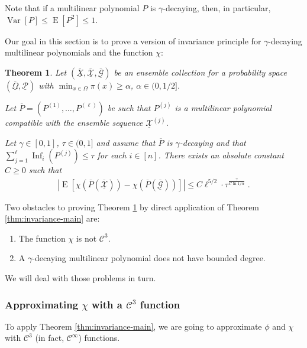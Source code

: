 \documentclass{daj}
\newcommand{\1}{\mathbbm{1}}
\theoremstyle{plain}
\newtheorem{theorem}{Theorem}[section]
\theoremstyle{definition}
\DeclareMathOperator*{\EE}{E}
\DeclareMathOperator*{\Var}{Var}
\DeclareMathOperator{\Inf}{Inf}
\begin{document}
Note that if a multilinear polynomial 
$P$ is $\gamma$-decaying, then, in particular,
$\Var[P] \le \EE[ P^2 ] \le 1$.

Our goal in this section is to prove a version of invariance principle
for $\gamma$-decaying multilinear polynomials and the function $\chi$:
\begin{theorem}
\label{thm:invariance-smoothed}
Let $(\overline{\underline{X}}, 
\overline{\underline{\mathcal{X}}},
\overline{\underline{\mathcal{G}}})$ be an ensemble collection
for a probability space 
$(\overline{\underline{\Omega}}, \underline{\mathcal{P}})$
with $\min_{x \in \Omega} \pi(x) \ge \alpha$, $\alpha \in (0, 1/2]$.

Let $\overline{P} = (P^{(1)}, \ldots, P^{(\ell)})$ be such that $P^{(j)}$
is a multilinear polynomial compatible with the ensemble sequence
$\underline{\mathcal{X}}^{(j)}$.

Let $\gamma \in [0,1]$, $\tau \in (0, 1]$ and assume that $\overline{P}$ is
$\gamma$-decaying and that $\sum_{j=1}^\ell \Inf_i(P^{(j)}) \le \tau$ for each
$i \in [n]$. There exists an absolute constant $C \ge 0$ such that
\begin{align*}
  \left| \EE \left[ 
  \chi(\overline{P}(\underline{\overline{\mathcal{X}}}))
  - \chi(\overline{P}(\underline{\overline{\mathcal{G}}}))
  \right] \right| \le
  C \ell^{5/2} \cdot \tau^{\frac{\gamma}{C \ln 1/ \alpha}} \; .
\end{align*}
\end{theorem}

Two obstacles to proving Theorem \ref{thm:invariance-smoothed}
by direct application of Theorem \ref{thm:invariance-main} are:
\begin{enumerate}
  \item The function $\chi$ is not $\mathcal{C}^3$.
  \item A $\gamma$-decaying multilinear polynomial does not have bounded degree.
\end{enumerate}
We will deal with those problems in turn.

\subsubsection{Approximating
\texorpdfstring{$\chi$}{chi}
with a 
\texorpdfstring{$\mathcal{C}^3$}{C\^{}3}
function}

To apply Theorem \ref{thm:invariance-main}, we are going
to approximate $\phi$ and $\chi$
with $\mathcal{C}^3$
(in fact, $\mathcal{C}^{\infty}$) functions.
\end{document}
